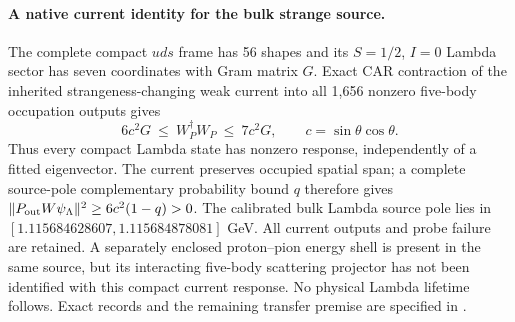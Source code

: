 \paragraph{A native current identity for the bulk strange source.}
The complete compact $uds$ frame has 56 shapes and its
$S=1/2$, $I=0$ Lambda sector has seven coordinates with Gram matrix $G$.
Exact CAR contraction of the inherited strangeness-changing weak current
into all 1,656 nonzero five-body occupation outputs gives
\[
6c^2G\ \leq\ W_P^\dagger W_P\ \leq\ 7c^2G,
\qquad c=\sin\theta\cos\theta.
\]
Thus every compact Lambda state has nonzero response, independently of a
fitted eigenvector. The current preserves occupied spatial span; a complete
source-pole complementary probability bound $q$ therefore gives
$\|P_{\rm out}W\psi_\Lambda\|^2\geq6c^2(1-q)>0$.
The calibrated bulk Lambda source pole lies in
$[1.115684628607,1.115684878081]$ GeV. All current outputs and probe failure
are retained. A separately enclosed proton--pion energy shell is present
in the same source, but its interacting five-body scattering projector has
not been identified with this compact current response. No physical
Lambda lifetime follows. Exact records and the remaining transfer premise
are specified in .

